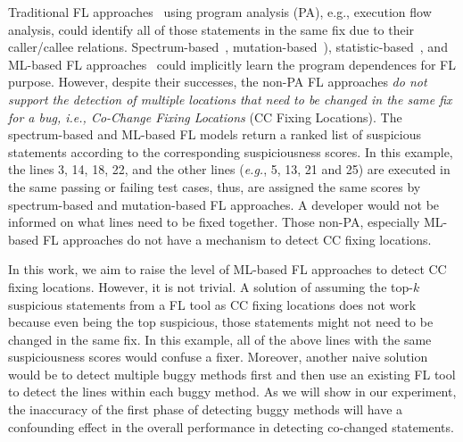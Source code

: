 Traditional FL approaches~\cite{zhang-fse09,ICICA-10} using program
analysis (PA), e.g., execution flow analysis, could identify all of
those statements in the same fix due to their caller/callee
relations. Spectrum-based~\cite{tarantula05,Ochiai},
mutation-based~\cite{MUSE,papadakis2012using,Metallaxis}),
statistic-based~\cite{liblit-pldi05}, and ML-based FL
approaches~\cite{DeepFL,icse21-fl} could implicitly learn the program
dependences for FL purpose. However, despite their successes, the non-PA FL
approaches {\em do not support the detection of multiple locations
  that need to be changed in the same fix for a bug, i.e., Co-Change
  Fixing Locations} (CC Fixing Locations).
%
The spectrum-based and ML-based FL models return a ranked list
of suspicious statements according to the corresponding suspiciousness
scores. In this example, the lines 3, 14, 18, 22, and the other lines
({\em e.g.}, 5, 13, 21 and 25) are executed in the same passing or
failing test cases, thus, are assigned the same scores by
spectrum-based and mutation-based FL approaches. A developer would not
be informed on what lines need to be fixed together. Those non-PA,
especially ML-based FL approaches do not have a mechanism to detect
CC fixing locations.

In this work, we aim to raise the level of ML-based FL approaches to
detect CC fixing locations. However, it is not trivial. A solution of
assuming the top-$k$ suspicious statements from a FL tool as CC fixing
locations does not work because even being the top suspicious, those
statements might not need to be changed in the same fix. In this
example, all of the above lines with the same suspiciousness scores
would confuse a fixer. Moreover, another naive solution would be to
detect multiple buggy methods first and then use an existing FL tool
to detect the lines within each buggy method. As we will show in our
experiment, the inaccuracy of the first phase of detecting buggy
methods will have a confounding effect in the overall performance in
detecting co-changed statements.


